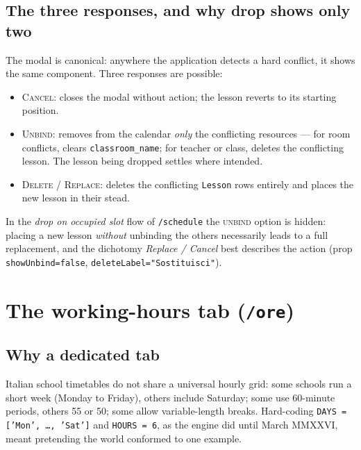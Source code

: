 \subsection{The three responses, and why drop shows only two}

The modal is canonical: anywhere the application detects a hard
conflict, it shows the same component. Three responses are
possible:
\begin{itemize}
  \item \textsc{Cancel}: closes the modal without action; the
    lesson reverts to its starting position.
  \item \textsc{Unbind}: removes from the calendar \emph{only}
    the conflicting resources --- for room conflicts, clears
    \texttt{classroom\_name}; for teacher or class, deletes the
    conflicting lesson. The lesson being dropped settles where
    intended.
  \item \textsc{Delete} / \textsc{Replace}: deletes the
    conflicting \texttt{Lesson} rows entirely and places the
    new lesson in their stead.
\end{itemize}
In the \emph{drop on occupied slot} flow of \texttt{/schedule}
the \textsc{unbind} option is hidden: placing a new lesson
\emph{without} unbinding the others necessarily leads to a full
replacement, and the dichotomy \emph{Replace / Cancel} best
describes the action (prop \texttt{showUnbind=false},
\texttt{deleteLabel="Sostituisci"}).

\section{The working-hours tab (\texttt{/ore})}

\label{sec:tab-ore-en}

\subsection{Why a dedicated tab}

Italian school timetables do not share a universal hourly grid:
some schools run a short week (Monday to Friday), others
include Saturday; some use 60-minute periods, others 55 or 50;
some allow variable-length breaks. Hard-coding \texttt{DAYS =
['Mon', \dots, 'Sat']} and \texttt{HOURS = 6}, as the engine
did until March MMXXVI, meant pretending the world conformed
to one example.

